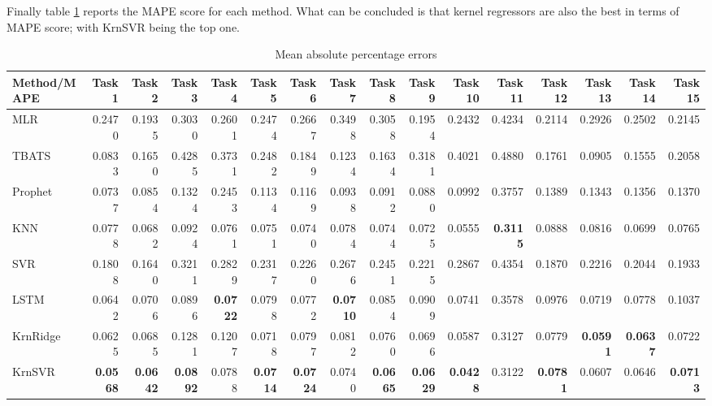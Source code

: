 Finally table \ref{tab:point_MAPE} reports the MAPE score for each method. What can be concluded is that kernel regressors are also the best in terms of MAPE score; with KrnSVR being the top one.
\begin{table}[!ht]
    \caption{Mean absolute percentage errors}
    \label{tab:point_MAPE}
    \begin{adjustbox}{width=\textwidth}
        \begin{tabular}{lrrrrrrrrrrrrrrr}
            \toprule
             Method/MAPE & Task 1 & Task 2 & Task 3 & Task 4 & Task 5 & Task 6 & Task 7 & Task 8 & Task 9 & Task 10 & Task 11 & Task 12 & Task 13 & Task 14 & Task 15 \\
            \midrule
            MLR & 0.2470 & 0.1935 & 0.3030 & 0.2601 & 0.2474 & 0.2667 & 0.3498 & 0.3058 & 0.1954 & 0.2432 & 0.4234 & 0.2114 & 0.2926 & 0.2502 & 0.2145 \\
            TBATS & 0.0833 & 0.1650 & 0.4285 & 0.3731 & 0.2482 & 0.1849 & 0.1234 & 0.1634 & 0.3181 & 0.4021 & 0.4880 & 0.1761 & 0.0905 & 0.1555 & 0.2058 \\
            Prophet & 0.0737 & 0.0854 & 0.1324 & 0.2453 & 0.1134 & 0.1169 & 0.0938 & 0.0912 & 0.0880 & 0.0992 & 0.3757 & 0.1389 & 0.1343 & 0.1356 & 0.1370 \\
            KNN & 0.0778 & 0.0682 & 0.0924 & 0.0761 & 0.0751 & 0.0740 & 0.0784 & 0.0744 & 0.0725 & 0.0555 & \textbf{0.3115} & 0.0888 & 0.0816 & 0.0699 & 0.0765 \\
            SVR & 0.1808 & 0.1640 & 0.3211 & 0.2829 & 0.2317 & 0.2260 & 0.2676 & 0.2451 & 0.2215 & 0.2867 & 0.4354 & 0.1870 & 0.2216 & 0.2044 & 0.1933 \\
            LSTM & 0.0642 & 0.0706 & 0.0896 & \textbf{0.0722} & 0.0798 & 0.0772 & \textbf{0.0710} & 0.0854 & 0.0909 & 0.0741 & 0.3578 & 0.0976 & 0.0719 & 0.0778 & 0.1037 \\
            KrnRidge & 0.0625 & 0.0685 & 0.1281 & 0.1207 & 0.0718 & 0.0797 & 0.0812 & 0.0760 & 0.0696 & 0.0587 & 0.3127 & 0.0779 & \textbf{0.0591} & \textbf{0.0637} & 0.0722 \\
            KrnSVR & \textbf{0.0568} & \textbf{0.0642} & \textbf{0.0892} & 0.0788 & \textbf{0.0714} & \textbf{0.0724} & 0.0740 & \textbf{0.0665} & \textbf{0.0629} & \textbf{0.0428} & 0.3122 & \textbf{0.0781} & 0.0607 & 0.0646 & \textbf{0.0713} \\
            \bottomrule
            \end{tabular}            
    \end{adjustbox}
\end{table}

